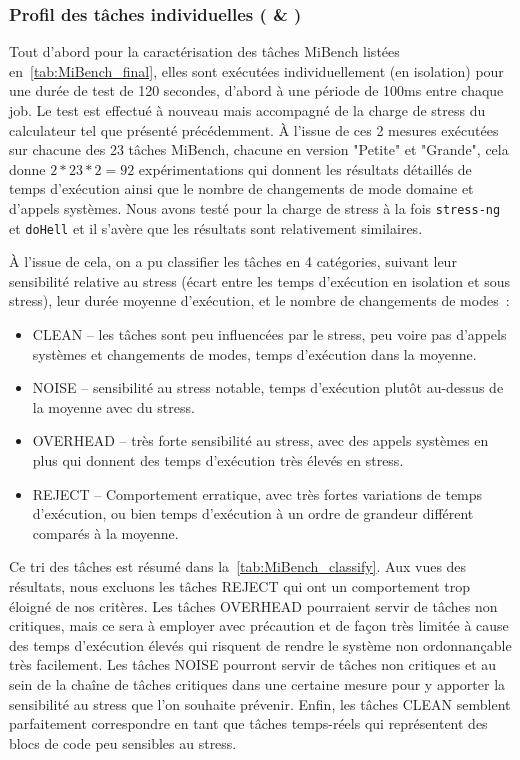 \documentclass[french, a4paper, 11pt, twoside, pdftex]{StyleThese}
\begin{document}
\subsubsection{Profil des tâches individuelles ( \& )}
Tout d'abord pour la caractérisation des tâches MiBench listées en~\autoref{tab:MiBench_final}, elles sont exécutées individuellement (en isolation) pour une durée de test de 120 secondes, d'abord à une période de 100ms entre chaque job. Le test est effectué à nouveau mais accompagné de la charge de stress du calculateur tel que présenté précédemment. À l'issue de ces 2 mesures exécutées sur chacune des 23 tâches MiBench, chacune en version "Petite" et "Grande", cela donne $2*23*2 = 92$ expérimentations qui donnent les résultats détaillés de temps d'exécution ainsi que le nombre de changements de mode domaine et d'appels systèmes. Nous avons testé pour la charge de stress à la fois \texttt{stress-ng} et \texttt{doHell} et il s'avère que les résultats sont relativement similaires.

À l'issue de cela, on a pu classifier les tâches en 4 catégories, suivant leur sensibilité relative au stress (écart entre les temps d'exécution en isolation et sous stress), leur durée moyenne d'exécution, et le nombre de changements de modes~: 
\begin{itemize}
	\item CLEAN -- les tâches sont peu influencées par le stress, peu voire pas d'appels systèmes et changements de modes, temps d'exécution dans la moyenne.
	\item NOISE -- sensibilité au stress notable, temps d'exécution plutôt au-dessus de la moyenne avec du stress.
	\item OVERHEAD -- très forte sensibilité au stress, avec des appels systèmes en plus qui donnent des temps d'exécution très élevés en stress.
	\item REJECT -- Comportement erratique, avec très fortes variations de temps d'exécution, ou bien temps d'exécution à un ordre de grandeur différent comparés à la moyenne.
\end{itemize}
Ce tri des tâches est résumé dans la~\autoref{tab:MiBench_classify}. Aux vues des résultats, nous excluons les tâches REJECT qui ont un comportement trop éloigné de nos critères. Les tâches OVERHEAD pourraient servir de tâches non critiques, mais ce sera à employer avec précaution et de façon très limitée à cause des temps d'exécution élevés qui risquent de rendre le système non ordonnançable très facilement. Les tâches NOISE pourront servir de tâches non critiques et au sein de la chaîne de tâches critiques dans une certaine mesure pour y apporter la sensibilité au stress que l'on souhaite prévenir. Enfin, les tâches CLEAN semblent parfaitement correspondre en tant que tâches temps-réels qui représentent des blocs de code peu sensibles au stress. 
 \smallbreak 
 
\end{document}
